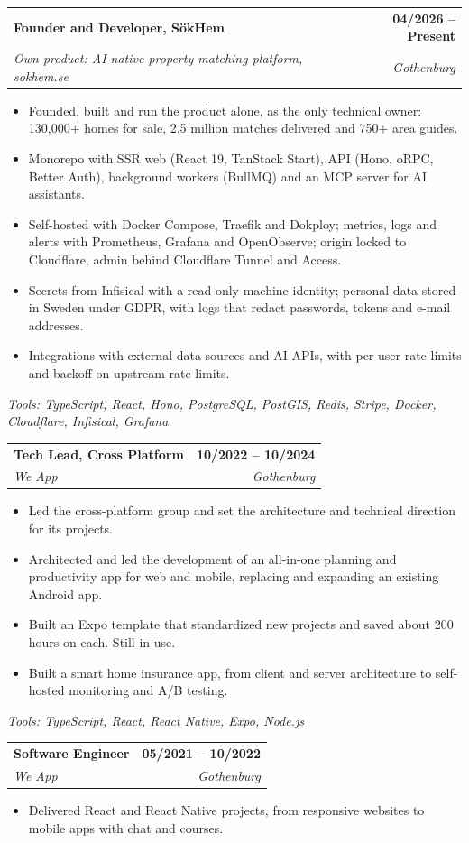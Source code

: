 \documentclass[a4paper,11pt]{article}
\makeatletter
\newcommand{\role}[4]{%
  \vspace{4pt}
  \begin{tabular*}{\textwidth}[t]{l@{\extracolsep{\fill}}r}
    \textbf{#1} & \textbf{\small #2} \\
    \textit{\small #3} & \textit{\small #4} \\
  \end{tabular*}\vspace{-2pt}}
\newenvironment{points}{\begin{itemize}[leftmargin=0.18in, itemsep=1pt, topsep=2pt, parsep=0pt]\small}{\end{itemize}}
\newcommand{\tools}[1]{{\small\textit{Tools: #1}}\par}
\makeatother
\begin{document}
\role{Founder and Developer, SökHem}{04/2026 -- Present}{Own product: AI-native property matching platform, sokhem.se}{Gothenburg}
\begin{points}
  \item Founded, built and run the product alone, as the only technical owner: 130,000+ homes for sale, 2.5 million matches delivered and 750+ area guides.
  \item Monorepo with SSR web (React 19, TanStack Start), API (Hono, oRPC, Better Auth), background workers (BullMQ) and an MCP server for AI assistants.
  \item Self-hosted with Docker Compose, Traefik and Dokploy; metrics, logs and alerts with Prometheus, Grafana and OpenObserve; origin locked to Cloudflare, admin behind Cloudflare Tunnel and Access.
  \item Secrets from Infisical with a read-only machine identity; personal data stored in Sweden under GDPR, with logs that redact passwords, tokens and e-mail addresses.
  \item Integrations with external data sources and AI APIs, with per-user rate limits and backoff on upstream rate limits.
\end{points}
\tools{TypeScript, React, Hono, PostgreSQL, PostGIS, Redis, Stripe, Docker, Cloudflare, Infisical, Grafana}

\role{Tech Lead, Cross Platform}{10/2022 -- 10/2024}{We App}{Gothenburg}
\begin{points}
  \item Led the cross-platform group and set the architecture and technical direction for its projects.
  \item Architected and led the development of an all-in-one planning and productivity app for web and mobile, replacing and expanding an existing Android app.
  \item Built an Expo template that standardized new projects and saved about 200 hours on each. Still in use.
  \item Built a smart home insurance app, from client and server architecture to self-hosted monitoring and A/B testing.
\end{points}
\tools{TypeScript, React, React Native, Expo, Node.js}

\role{Software Engineer}{05/2021 -- 10/2022}{We App}{Gothenburg}
\begin{points}
  \item Delivered React and React Native projects, from responsive websites to mobile apps with chat and courses.
\end{points}
\end{document}
